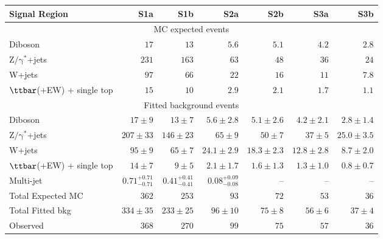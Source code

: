 \begin{table}[tbp]
\tiny
\begin{center}
\vspace*{-0.035\textwidth}
\begin{tabular}{|lrrrrrr|}
\hline
Signal Region & \textbf{ S1a } & \textbf{ S1b } & \textbf{ S2a } & \textbf{ S2b } & \textbf{ S3a } & \textbf{ S3b } \\
\hline
\multicolumn{7}{|c|}{MC expected events} \\ \hline
Diboson &  $17$               &  $13$               &  $5.6$               &  $5.1$               &  $4.2$               &  $2.8$               \\
$\mathrm{Z/\gamma^{*}}$+jets &  $231$               &  $163$               &  $63$               &  $48$               &  $36$               &  $24$               \\
W+jets &  $97$               &  $66$               &  $22$               &  $16$               &  $11$               &  $7.8$               \\
$\ttbar$(+EW) + single top &  $15$               &  $10$               &  $2.9$               &  $2.1$               &  $1.7$               &  $1.1$               \\
\hline
\multicolumn{7}{|c|}{Fitted background events} \\ \hline
Diboson & $17 \pm 9$ & $13 \pm 7$ & $5.6 \pm 2.8$ & $5.1 \pm 2.6$ & $4.2 \pm 2.1$ & $2.8 \pm 1.4$ \\
$\mathrm{Z/\gamma^{*}}$+jets & $207 \pm 33$ & $146 \pm 23$ & $65 \pm 9$ & $50 \pm 7$ & $37 \pm 5$ & $25.0 \pm 3.5$ \\
W+jets & $95 \pm 9$ & $65 \pm 7$ & $24.1 \pm 2.9$ & $18.3 \pm 2.3$ & $12.8 \pm 2.8$ & $8.7 \pm 2.0$ \\
$\ttbar$(+EW) + single top & $14 \pm 7$ & $9 \pm 5$ & $2.1 \pm 1.7$ & $1.6 \pm 1.3$ & $1.3 \pm 1.0$ & $0.8 \pm 0.7$ \\
Multi-jet &  $0.71_{-0.71}^{+0.71}$               &  $0.41_{-0.41}^{+0.41}$               &  $0.08_{-0.08}^{+0.09}$               & -- & -- & -- \\
\hline
Total Expected MC &  $362$               &  $253$               &  $93$               &  $72$               &  $53$               &  $36$               \\
\hline
Total Fitted bkg & $334 \pm 35$ & $233 \pm 25$ & $96 \pm 10$ & $75 \pm 8$ & $56 \pm 6$ & $37 \pm 4$ \\
\hline
Observed &  $368$                     &  $270$                     &  $99$                     &  $75$                     &  $57$                     &  $36$                     \\
\hline



\end{tabular}
\end{center}
\end{table}
